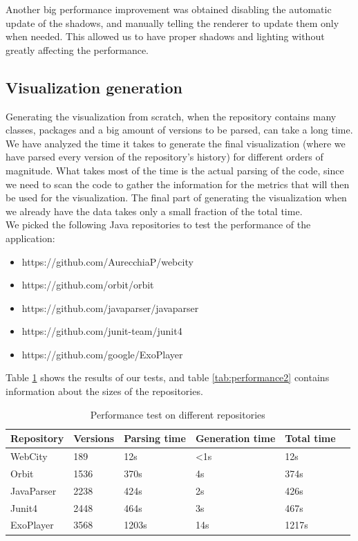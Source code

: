 \documentclass[]{usiinfbachelorproject}
\begin{document}
Another big performance improvement was obtained disabling the automatic update of the shadows, and manually telling the renderer to update them only when needed. This allowed us to have proper shadows and lighting without greatly affecting the performance.

\subsection{Visualization generation} \label{Visualization generation}

Generating the visualization from scratch, when the repository contains many classes, packages and a big amount of versions to be parsed, can take a long time. We have analyzed the time it takes to generate the final visualization (where we have parsed every version of the repository's history) for different orders of magnitude. What takes most of the time is the actual parsing of the code, since we need to scan the code to gather the information for the metrics that will then be used for the visualization. The final part of generating the visualization when we already have the data takes only a small fraction of the total time.\\

We picked the following Java repositories to test the performance of the application:

\begin{itemize}
    \item https://github.com/AurecchiaP/webcity
    \item https://github.com/orbit/orbit
    \item https://github.com/javaparser/javaparser
    \item https://github.com/junit-team/junit4
    \item https://github.com/google/ExoPlayer
\end{itemize}

Table \ref{tab:performance} shows the results of our tests, and table \ref{tab:performance2} contains information about the sizes of the repositories.

\begin{table}[H]
    \begin{center}
        \begin{tabular}{ | l | l | l | l | l | l |}
        \hline
        Repository & Versions & Parsing time & Generation time & Total time \\ \hline
        WebCity & 189 & 12s & <1s & 12s \\ \hline
        Orbit & 1536 & 370s & 4s & 374s \\ \hline
        JavaParser & 2238 & 424s & 2s & 426s \\ \hline
        Junit4 & 2448 & 464s & 3s & 467s \\ \hline
        ExoPlayer & 3568 & 1203s & 14s & 1217s \\ \hline
        \end{tabular}
    \end{center}
    \caption{Performance test on different repositories}
    \label{tab:performance}
\end{table}
\end{document}
